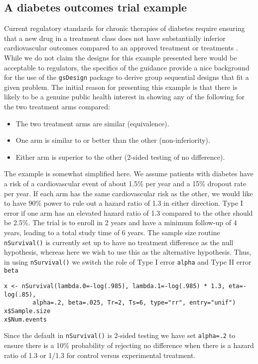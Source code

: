 \subsection{A diabetes outcomes trial example\label{sec:motivationDiab}}
Current regulatory standards for chronic therapies of diabetes require ensuring that a new drug in a treatment class does not have substantially inferior cardiovascular outcomes compared to an approved treatment or treatments \cite{DiabetesCV}.
While we do not claim the designs for this example presented here would be acceptable to regulators, the specifics of the guidance provide a nice background for the use of the \texttt{gsDesign} package to derive group sequential designs that fit a given problem.
The initial reason for presenting this example is that there is likely to be a genuine public health interest in showing any of the following for the two treatment arms compared:
\begin{itemize}
\item The two treatment arms are similar (equivalence).
\item One arm is similar to or better than the other (non-inferiority).
\item Either arm is superior to the other (2-sided testing of no difference).
\end{itemize}
The example is somewhat simplified here.
We assume patients with diabetes have a risk of a cardiovascular event of about 1.5\% per year and a 15\% dropout rate per year.
If each arm has the same cardiovascular risk as the other, we would like to have 90\% power to rule out a hazard ratio of 1.3 in either direction.
Type I error if one arm has an elevated hazard ratio of 1.3 compared to the other should be 2.5\%.
The trial is to enroll in 2 years and have a minimum follow-up of 4 years, leading to a total study time of 6 years.
The sample size routine \texttt{nSurvival()} is currently set up to have no treatment difference as the null hypothesis, whereas here we wish to use this as the alternative hypothesis.
Thus, in using \texttt{nSurvival()} we switch the role of Type I error \texttt{alpha} and Type II error \texttt{beta}
\begin{verbatim}
x <- nSurvival(lambda.0=-log(.985), lambda.1=-log(.985) * 1.3, eta=-log(.85),
        alpha=.2, beta=.025, Tr=2, Ts=6, type="rr", entry="unif")
x$Sample.size
x$Num.events
\end{verbatim}
Since the default in \texttt{nSurvival()} is 2-sided testing we have set \texttt{alpha=.2} to ensure there is a 10\% probability of rejecting no difference when there is a hazard ratio of 1.3 or 1/1.3 for control versus experimental treatment.
